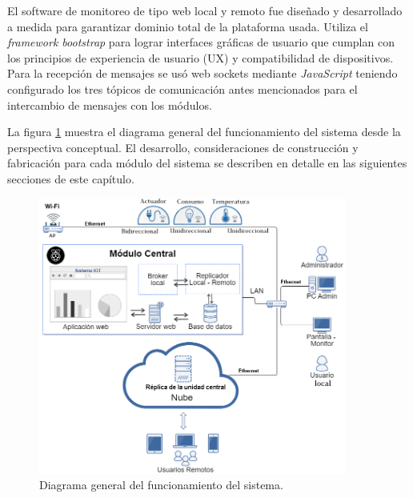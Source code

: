 El software de monitoreo de tipo web local y remoto fue diseñado y desarrollado a medida para garantizar dominio total de la plataforma usada. Utiliza el \emph{framework bootstrap} para lograr interfaces gráficas de usuario que cumplan con los principios de experiencia de usuario (UX) y compatibilidad de dispositivos. Para la recepción de mensajes se usó web sockets mediante \emph{JavaScript} teniendo configurado los tres tópicos de comunicación antes mencionados para el intercambio de mensajes con los módulos.

La figura \ref{fig:diagrama_general} muestra el diagrama general del funcionamiento del sistema desde la perspectiva conceptual. El desarrollo, consideraciones de construcción y fabricación para cada módulo del sistema se describen en detalle en las siguientes secciones de este capítulo.


\begin{figure}[htbp]
	\centering
	\includegraphics[width=0.9\textwidth]{./Figures/diagrama0.png}
	\caption{Diagrama general del funcionamiento del sistema.}

	\label{fig:diagrama_general}
\end{figure}





